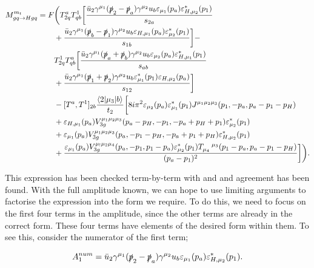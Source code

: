 \begin{equation}
\begin{split}
M_{gq \to Hgq}^{m_t} = F &\biggl( T^a_{2q}T^1_{qb} \biggl[ \frac{ \bar{u}_2 \gamma^{\mu_1} (\slashed{p}_2 - \slashed{p}_a ) \gamma^{\mu_2} u_b \varepsilon_{\mu_1} (p_a) \varepsilon_{H,\mu_2}^*(p_1)}{s_{2a}} \\
&+ \frac{\bar{u}_2 \gamma^{\mu_1} (\slashed{p}_b - \slashed{p}_1)\gamma^{\mu_2}u_b \varepsilon_{H,\mu_1}(p_a)\varepsilon^*_{\mu_2}(p_1)}{s_{1b}} \biggr] - \\
&T^1_{2q}T^a_{qb} \biggl[ \frac{\bar{u}_2 \gamma^{\mu_1}(\slashed{p}_a+\slashed{p}_b)\gamma^{\mu_2} u_b \varepsilon_{\mu_2}(p_a)\varepsilon^*_{H,\mu_1}(p_1)}{s_{ab}} \\
& + \frac{\bar{u}_2 \gamma^{\mu_1}(\slashed{p}_1+\slashed{p}_2)\gamma^{\mu_2}u_b \varepsilon_{\mu_1}^*(p_1) \varepsilon_{H,\mu_2}(p_a)}{s_{12}} \biggr]  \\
 &- [T^a, T^1]_{2b} \frac{\mathinner{\langle2\vert\mu_3\vert b\rangle}_{}}{t_2} \biggl[ 8 i \pi^2 \varepsilon_{\mu_2}(p_a) \varepsilon^*_{\mu_1}(p_1)J^{\mu_1 \mu_2 \mu_3}(p_1,-p_a,p_a-p_1-p_H) \\
&+  \varepsilon_{H,\mu_1}(p_a)V_{3g}^{\mu_1 \mu_2 \mu_3}(p_a-p_H, -p_1, -p_a + p_H + p_1) \varepsilon^*_{\mu_2}(p_1)  \\
&+  \varepsilon_{\mu_1}(p_a)V_{3g}^{\mu_1 \mu_2 \mu_3}(p_a,-p_1-p_H,-p_a+p_1+p_H)\varepsilon_{H,\mu_2}^*(p_1)  \\
&+  \frac{\varepsilon_{\mu_1}(p_a)V_{3g}^{\mu_! \mu_2 \mu_4}(p_a,-p_1,p_1-p_a)\varepsilon^*_{\mu_2}(p_1)T_{\mu_4}^{\hspace{10pt} \mu_3}(p_1-p_a,p_a-p_1-p_H)}{(p_a-p_1)^2} \biggr] \biggr).
\end{split}
\end{equation}

This expression has been checked term-by-term with \cite{DelDuca2001} and \cite{Duca2003} and agreement has been found. With the full amplitude known, we can hope to use limiting arguments to factorise the expression into the form we require. To do this, we need to focus on the first four terms in the amplitude, since the other terms are already in the correct form. These four terms have elements of the desired form within them. To see this, consider the numerator of the first term;

\begin{equation}
A_1^{num} = \bar{u}_2 \gamma^{\mu_1}(\slashed{p}_2-\slashed{p}_a)\gamma^{\mu_2}u_b \varepsilon_{\mu_1}(p_a)\varepsilon^*_{H,\mu_2}(p_1).
\end{equation}

